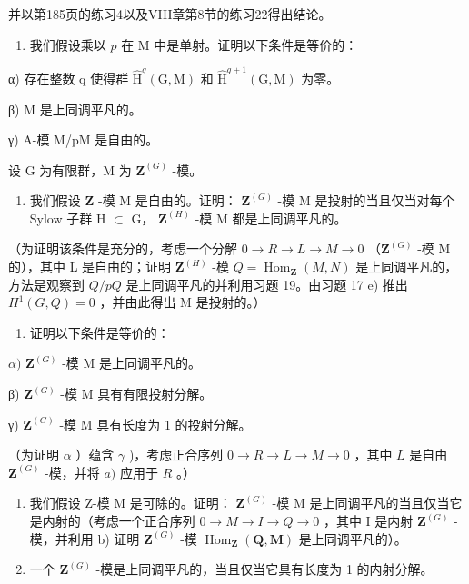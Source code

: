 并以第185页的练习4以及VIII章第8节的练习22得出结论。

\begin{enumerate}
\def\labelenumi{\alph{enumi})}
\setcounter{enumi}{1}
\tightlist
\item
  我们假设乘以 \(p\) 在 M 中是单射。证明以下条件是等价的：
\end{enumerate}

α) 存在整数 q 使得群 \(\hat{\mathrm{H}}^{q}(\mathrm{G},\mathrm{M})\) 和 \(\hat{\mathrm{H}}^{q+1}(\mathrm{G},\mathrm{M})\) 为零。

β) M 是上同调平凡的。

γ) A-模 M/pM 是自由的。

设 G 为有限群，M 为 \(\mathbf{Z}^{(G)}\) -模。

\begin{enumerate}
\def\labelenumi{\alph{enumi})}
\tightlist
\item
  我们假设 \(\mathbf{Z}\) -模 M 是自由的。证明： \(\mathbf{Z}^{(G)}\) -模 M 是投射的当且仅当对每个 Sylow 子群 H \(\subset\) G， \(\mathbf{Z}^{(H)}\) -模 M 都是上同调平凡的。
\end{enumerate}

（为证明该条件是充分的，考虑一个分解 \(0 \to R \to L \to M \to 0\) （\(\mathbf{Z}^{(G)}\) -模 M 的），其中 L 是自由的；证明 \(\mathbf{Z}^{(H)}\) -模 \(Q = \operatorname{Hom}_{\mathbf{Z}}(M, N)\) 是上同调平凡的，方法是观察到 \(Q/pQ\) 是上同调平凡的并利用习题 19。由习题 17 e) 推出 \(H^1(G, Q) = 0\) ，并由此得出 M 是投射的。）

\begin{enumerate}
\def\labelenumi{\alph{enumi})}
\setcounter{enumi}{1}
\tightlist
\item
  证明以下条件是等价的：
\end{enumerate}

\(\alpha)\) \(\mathbf{Z}^{(G)}\) -模 M 是上同调平凡的。

β) \(\mathbf{Z}^{(G)}\) -模 M 具有有限投射分解。

γ) \(\mathbf{Z}^{(G)}\) -模 M 具有长度为 1 的投射分解。

（为证明 \(\alpha\) ）蕴含 \(\gamma\) )，考虑正合序列 \(0 \to R \to L \to M \to 0\) ，其中 \(L\) 是自由 \(\mathbf{Z}^{(G)}\) -模，并将 \(a)\) 应用于 \(R\) 。）

\begin{enumerate}
\def\labelenumi{\alph{enumi})}
\setcounter{enumi}{2}
\item
  我们假设 Z-模 M 是可除的。证明： \(\mathbf{Z}^{(G)}\) -模 M 是上同调平凡的当且仅当它是内射的（考虑一个正合序列 \(0 \rightarrow M \rightarrow I \rightarrow Q \rightarrow 0\) ，其中 I 是内射 \(\mathbf{Z}^{(G)}\) -模，并利用 b) 证明 \(\mathbf{Z}^{(G)}\) -模 \(\operatorname{Hom}_{\mathbf{Z}}(\mathbf{Q}, \mathbf{M})\) 是上同调平凡的）。
\item
  一个 \(\mathbf{Z}^{(G)}\) -模是上同调平凡的，当且仅当它具有长度为 1 的内射分解。
\end{enumerate}

